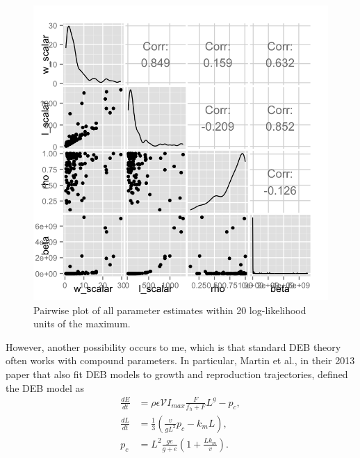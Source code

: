 \documentclass[12pt,reqno,final,pdftex]{amsart}\usepackage[]{graphicx}\usepackage[]{color}
\newenvironment{knitrout}{}{} %
\theoremstyle{plain}
\numberwithin{equation}{part}
\begin{document}
\begin{knitrout}\scriptsize
{}\color{fgcolor}\begin{figure}

\includegraphics[width=\linewidth]{figure/nondim-fig-1} \hfill{}

\caption[Pairwise plot of all parameter estimates within 20 log-likelihood units of the maximum]{Pairwise plot of all parameter estimates within 20 log-likelihood units of the maximum.}\label{fig:nondim-fig}
\end{figure}


\end{knitrout}

However, another possibility occurs to me, which is that standard DEB theory often works with compound parameters.
In particular, Martin et al., in their 2013 paper that also fit DEB models to growth and reproduction trajectories, defined the DEB model as
\begin{align}
  \frac{dE}{dt} &= \rho \epsilon \mathcal{V} I_{max} \frac{F}{f_h+F} L^g - p_c, \\
  \frac{dL}{dt} &= \frac{1}{3}\left(\frac{v}{gL^2} p_c - k_m L\right), \\
p_c &= L^2 \frac{g e}{g + e}\left(1 + \frac{L k_m}{v}\right).
\end{align}
\end{document}
